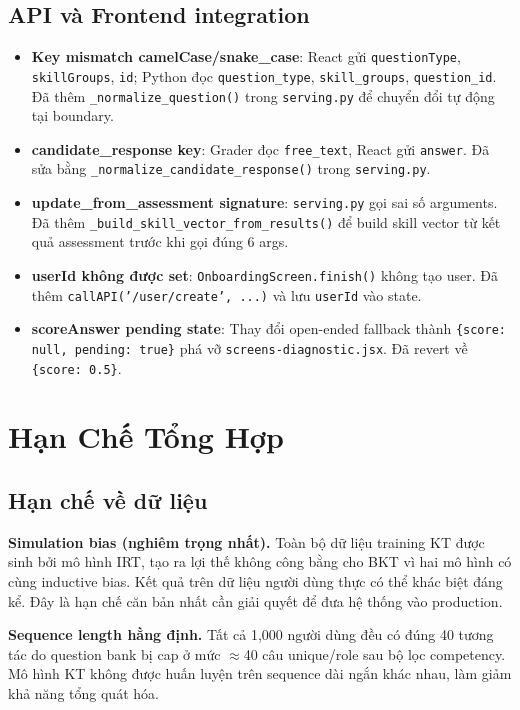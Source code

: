 \subsection{API và Frontend integration}
\begin{itemize}
  \item \textbf{Key mismatch camelCase/snake\_case}: React gửi \texttt{questionType}, \texttt{skillGroups}, \texttt{id}; Python đọc \texttt{question\_type}, \texttt{skill\_groups}, \texttt{question\_id}. Đã thêm \texttt{\_normalize\_question()} trong \texttt{serving.py} để chuyển đổi tự động tại boundary.
  \item \textbf{candidate\_response key}: Grader đọc \texttt{free\_text}, React gửi \texttt{answer}. Đã sửa bằng \texttt{\_normalize\_candidate\_response()} trong \texttt{serving.py}.
  \item \textbf{update\_from\_assessment signature}: \texttt{serving.py} gọi sai số arguments. Đã thêm \texttt{\_build\_skill\_vector\_from\_results()} để build skill vector từ kết quả assessment trước khi gọi đúng 6 args.
  \item \textbf{userId không được set}: \texttt{OnboardingScreen.finish()} không tạo user. Đã thêm \texttt{callAPI('/user/create', ...)} và lưu \texttt{userId} vào state.
  \item \textbf{scoreAnswer pending state}: Thay đổi open-ended fallback thành \texttt{\{score: null, pending: true\}} phá vỡ \texttt{screens-diagnostic.jsx}. Đã revert về \texttt{\{score: 0.5\}}.
\end{itemize}

\section{Hạn Chế Tổng Hợp}
\label{sec:limitations_summary}

\subsection{Hạn chế về dữ liệu}

\textbf{Simulation bias (nghiêm trọng nhất).} Toàn bộ dữ liệu training KT được sinh bởi mô hình IRT, tạo ra lợi thế không công bằng cho BKT vì hai mô hình có cùng inductive bias. Kết quả trên dữ liệu người dùng thực có thể khác biệt đáng kể. Đây là hạn chế căn bản nhất cần giải quyết để đưa hệ thống vào production.

\textbf{Sequence length hằng định.} Tất cả 1{,}000 người dùng đều có đúng 40 tương tác do question bank bị cap ở mức $\approx$40 câu unique/role sau bộ lọc competency. Mô hình KT không được huấn luyện trên sequence dài ngắn khác nhau, làm giảm khả năng tổng quát hóa.

